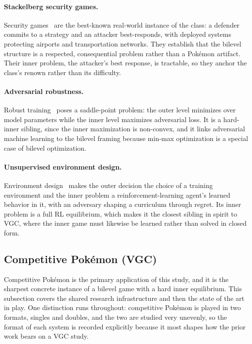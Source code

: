 \paragraph{Stackelberg security games.}
Security games~\cite{tambe2011security} are the best-known real-world instance of
the class: a defender commits to a strategy and an attacker best-responds, with
deployed systems protecting airports and transportation networks. They establish
that the bilevel structure is a respected, consequential problem rather than a
Pok\'{e}mon artifact. Their inner problem, the attacker's best response, is
tractable, so they anchor the class's renown rather than its difficulty.

\paragraph{Adversarial robustness.}
Robust training~\cite{madry2018towards} poses a saddle-point problem: the outer
level minimizes over model parameters while the inner level maximizes adversarial
loss. It is a hard-inner sibling, since the inner maximization is non-convex, and
it links adversarial machine learning to the bilevel framing because min-max
optimization is a special case of bilevel optimization.

\paragraph{Unsupervised environment design.}
Environment design~\cite{dennis2020emergent} makes the outer decision the choice
of a training environment and the inner problem a reinforcement-learning agent's
learned behavior in it, with an adversary shaping a curriculum through regret.
Its inner problem is a full RL equilibrium, which makes it the closest sibling in
spirit to VGC, where the inner game must likewise be learned rather than solved in
closed form.

\clearpage
\subsection{Competitive Pok\'{e}mon (VGC)}
\label{subsec:vgc_application}

Competitive Pok\'{e}mon is the primary application of this study, and it is the
sharpest concrete instance of a bilevel game with a hard inner equilibrium. This
subsection covers the shared research infrastructure and then the state of the art
in play. One distinction runs throughout: competitive Pok\'{e}mon is played in two
formats, singles and doubles, and the two are studied very unevenly, so the format
of each system is recorded explicitly because it most shapes how the prior work
bears on a VGC study.

